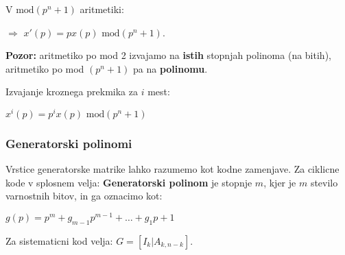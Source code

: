 \documentclass{article}
\begin{document}
\begin{multicols}{3}
V $\text{mod}(p^n + 1)$ aritmetiki:
\begin{center}
    $\Rightarrow$ $x'(p) = px(p) \text{ mod}(p^n + 1)$.
\end{center}

\textbf{Pozor:} aritmetiko po mod 2 izvajamo na \textbf{istih} stopnjah polinoma (na bitih), aritmetiko
po mod $(p^n + 1)$ pa na \textbf{polinomu}.

Izvajanje kroznega prekmika za $i$ mest:
\begin{center}
    \begin{math}
        x^i(p) = p^i x(p) \text{ mod} (p^n + 1)
    \end{math}
\end{center}

\subsubsection{Generatorski polinomi}
Vrstice generatorske matrike lahko razumemo kot kodne zamenjave.
Za ciklicne kode v splosnem velja: \textbf{Generatorski polinom} je stopnje $m$, kjer je $m$ stevilo
varnostnih bitov, in ga oznacimo kot:
\begin{center}
    \begin{math}
        g(p) = p^m + g_{m-1}p^{m-1} + \dots + g_1p + 1
    \end{math}
\end{center}
Za sistematicni kod velja: $G = [I_k | A_{k, n-k}]$.
\end{multicols}
\end{document}
